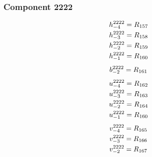 \documentclass[11pt,a4paper]{article}
\begin{document}
\subsubsection{Component 2222}
\begin{equation}
\shortstack[l]{$\displaystyle h^{2222}_{-4}=R_{157}$\\
$\displaystyle h^{2222}_{-3}=R_{158}$\\
$\displaystyle h^{2222}_{-2}=R_{159}$\\
$\displaystyle h^{2222}_{-1}=R_{160}$}
\label{eq:cat-map-50}
\end{equation}
\begin{equation}
\shortstack[l]{$\displaystyle b^{2222}_{-2}=R_{161}$}
\label{eq:cat-map-51}
\end{equation}
\begin{equation}
\shortstack[l]{$\displaystyle u^{2222}_{-4}=R_{162}$\\
$\displaystyle u^{2222}_{-3}=R_{163}$\\
$\displaystyle u^{2222}_{-2}=R_{164}$\\
$\displaystyle u^{2222}_{-1}=R_{160}$}
\label{eq:cat-map-52}
\end{equation}
\begin{equation}
\shortstack[l]{$\displaystyle v^{2222}_{-4}=R_{165}$\\
$\displaystyle v^{2222}_{-3}=R_{166}$\\
$\displaystyle v^{2222}_{-2}=R_{167}$}
\label{eq:cat-map-53}
\end{equation}
\end{document}

